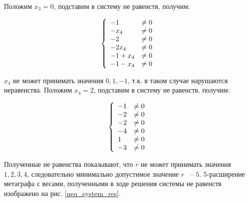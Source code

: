 \documentclass[14pt]{mmcs-article}
\begin{document}
Положим $x_3 = 0$, подставим в систему не равенств, получим:

\begin{equation}
    \centering
    \left\{
        \begin{array}{ll}
            - 1 &\neq 0\\
            - x_4 &\neq 0\\
            - 2 &\neq 0\\
            - 2 x_4 &\neq 0\\
            - 1 + x_4 &\neq 0\\
            - 1 - x_4 &\neq 0\\
        \end{array}
    \right.
    \label{eqs:cycle_search_neqs}
\end{equation}

$x_4$ не может принимать значения $0, 1, -1$, т.к. в таком случае нарушаются неравенства. Положим $x_4 = 2$, подставим в систему не равенств, получим:

\begin{equation}
    \centering
    \left\{
        \begin{array}{ll}
            - 1 &\neq 0\\
            - 2 &\neq 0\\
            - 2 &\neq 0\\
            - 4 &\neq 0\\
            1 &\neq 0\\
            - 3 &\neq 0\\
        \end{array}
    \right.
    \label{eqs:cycle_search_neqs}
\end{equation}

Полученные не равенства показывают, что $r$ не может принимать значения $1, 2, 3, 4$, следовательно минимально допустимое значение $r$ ~-- $5$. 5-расширение метаграфа с весами, полученными в ходе решения системы не равенств изображено на рис. \ref{neq_system_res}.
\end{document}
